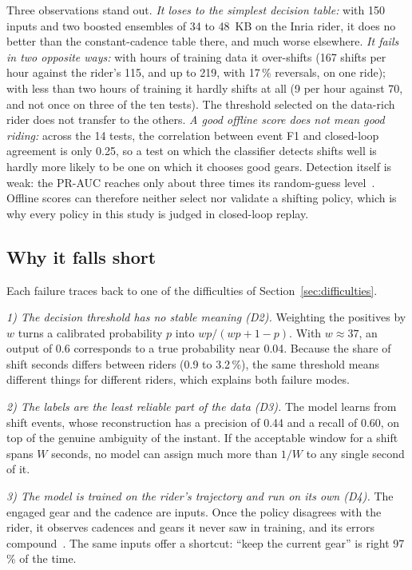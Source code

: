 \documentclass[conference]{IEEEtran}
\newcommand{\pct}{\,\%}
\begin{document}
Three observations stand out.
\emph{It loses to the simplest decision table:} with 150 inputs and two boosted ensembles of 34 to 48~KB on the Inria rider, it does no better than the constant-cadence table there, and much worse elsewhere.
\emph{It fails in two opposite ways:} with hours of training data it over-shifts (167 shifts per hour against the rider's 115, and up to 219, with 17\pct{} reversals, on one ride); with less than two hours of training it hardly shifts at all (9 per hour against 70, and not once on three of the ten tests). The threshold selected on the data-rich rider does not transfer to the others.
\emph{A good offline score does not mean good riding:} across the 14 tests, the correlation between event F1 and closed-loop agreement is only 0.25, so a test on which the classifier detects shifts well is hardly more likely to be one on which it chooses good gears. Detection itself is weak: the PR-AUC reaches only about three times its random-guess level~\cite{saito}. Offline scores can therefore neither select nor validate a shifting policy, which is why every policy in this study is judged in closed-loop replay.

\subsection{Why it falls short}
Each failure traces back to one of the difficulties of Section~\ref{sec:difficulties}.

\emph{1) The decision threshold has no stable meaning (D2).} Weighting the positives by $w$ turns a calibrated probability $p$ into $w p / (w p + 1 - p)$. With $w \approx 37$, an output of 0.6 corresponds to a true probability near 0.04. Because the share of shift seconds differs between riders (0.9 to 3.2\pct{}), the same threshold means different things for different riders, which explains both failure modes.

\emph{2) The labels are the least reliable part of the data (D3).} The model learns from shift events, whose reconstruction has a precision of 0.44 and a recall of 0.60, on top of the genuine ambiguity of the instant. If the acceptable window for a shift spans $W$ seconds, no model can assign much more than $1/W$ to any single second of it.

\emph{3) The model is trained on the rider's trajectory and run on its own (D4).} The engaged gear and the cadence are inputs. Once the policy disagrees with the rider, it observes cadences and gears it never saw in training, and its errors compound~\cite{dagger}. The same inputs offer a shortcut: ``keep the current gear'' is right 97\pct{} of the time.
\end{document}

